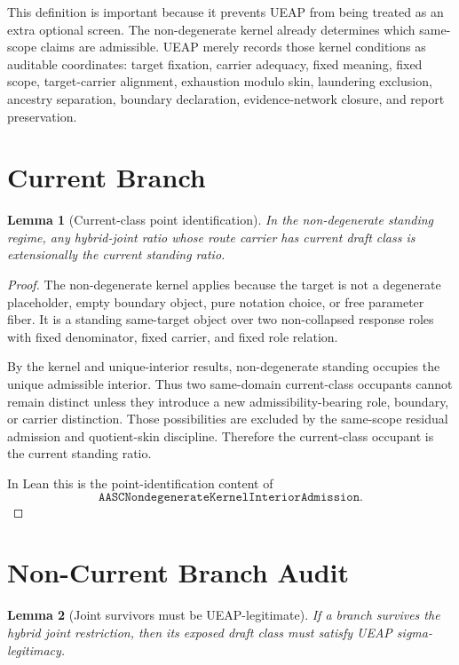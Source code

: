 \documentclass[11pt]{article}
\newtheorem{lemma}{Lemma}
\theoremstyle{definition}
\begin{document}
This definition is important because it prevents UEAP from being treated as
an extra optional screen. The non-degenerate kernel already determines which
same-scope claims are admissible. UEAP merely records those kernel conditions
as auditable coordinates: target fixation, carrier adequacy, fixed meaning,
fixed scope, target-carrier alignment, exhaustion modulo skin, laundering
exclusion, ancestry separation, boundary declaration, evidence-network
closure, and report preservation.

\section{Current Branch}

\begin{lemma}[Current-class point identification]
In the non-degenerate standing regime, any hybrid-joint ratio whose route
carrier has current draft class is extensionally the current standing ratio.
\end{lemma}

\begin{proof}
The non-degenerate kernel applies because the target is not a degenerate
placeholder, empty boundary object, pure notation choice, or free parameter
fiber. It is a standing same-target object over two non-collapsed response
roles with fixed denominator, fixed carrier, and fixed role relation.

By the kernel and unique-interior results, non-degenerate standing occupies
the unique admissible interior. Thus two same-domain current-class occupants
cannot remain distinct unless they introduce a new admissibility-bearing role,
boundary, or carrier distinction. Those possibilities are excluded by the
same-scope residual admission and quotient-skin discipline. Therefore the
current-class occupant is the current standing ratio.

In Lean this is the point-identification content of
\[
\texttt{AASCNondegenerateKernelInteriorAdmission}.
\]
\end{proof}

\section{Non-Current Branch Audit}

\begin{lemma}[Joint survivors must be UEAP-legitimate]
If a branch survives the hybrid joint restriction, then its exposed draft
class must satisfy UEAP sigma-legitimacy.
\end{lemma}
\end{document}
